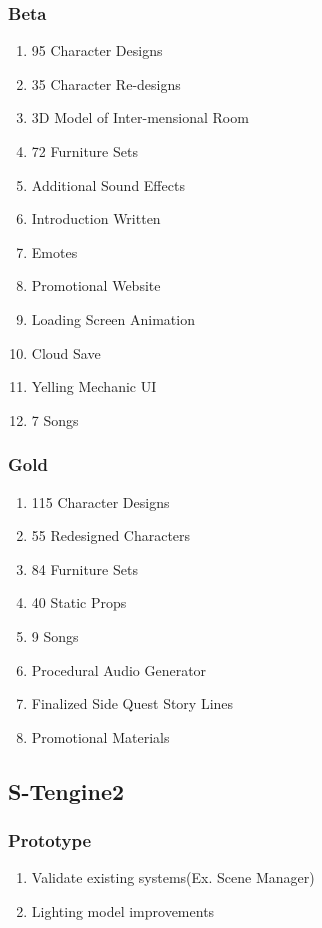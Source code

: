 \documentclass{GlobalDocument}
\begin{document}
\subsubsection{Beta} 
\begin{enumerate}
\item 95 Character Designs
\item 35 Character Re-designs
\item 3D Model of Inter-mensional Room
\item 72 Furniture Sets
\item Additional Sound Effects
\item Introduction Written
\item Emotes
\item Promotional Website
\item Loading Screen Animation
\item Cloud Save
\item Yelling Mechanic UI
\item 7 Songs
\end{enumerate}

\subsubsection{Gold} 
\begin{enumerate}
\item 115 Character Designs 
\item 55 Redesigned Characters
\item 84 Furniture Sets
\item 40 Static Props
\item 9 Songs
\item Procedural Audio Generator
\item Finalized Side Quest Story Lines
\item Promotional Materials
\end{enumerate}

\subsection{S-Tengine2}
\subsubsection{Prototype}
\begin{enumerate}
\item Validate  existing systems(Ex. Scene Manager)
\item Lighting model improvements
\end{enumerate}
\end{document}
